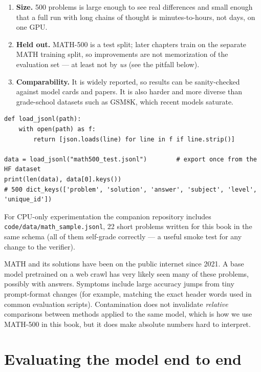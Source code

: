 \begin{enumerate}
  \item \textbf{Size.} 500 problems is large enough to see real differences and small enough that
  a full run with long chains of thought is minutes-to-hours, not days, on one GPU.
  \item \textbf{Held out.} MATH-500 is a test split; later chapters train on the separate MATH
  training split, so improvements are not memorization of the evaluation set --- at least not by
  \emph{us} (see the pitfall below).
  \item \textbf{Comparability.} It is widely reported, so results can be sanity-checked against
  model cards and papers. It is also harder and more diverse than grade-school datasets such as
  GSM8K, which recent models saturate.
\end{enumerate}

\begin{lstlisting}[caption={Loading a benchmark stored as JSON Lines.},label={lst:eval:loadjsonl}]
def load_jsonl(path):
    with open(path) as f:
        return [json.loads(line) for line in f if line.strip()]

data = load_jsonl("math500_test.jsonl")        # export once from the HF dataset
print(len(data), data[0].keys())
# 500 dict_keys(['problem', 'solution', 'answer', 'subject', 'level', 'unique_id'])
\end{lstlisting}

For CPU-only experimentation the companion repository includes \texttt{code/data/math\_sample.jsonl},
22 short problems written for this book in the same schema (all of them self-grade correctly ---
a useful smoke test for any change to the verifier).

\begin{pitfall}[Contamination]
MATH and its solutions have been on the public internet since 2021. A base model pretrained on a
web crawl has very likely seen many of these problems, possibly with answers. Symptoms include
large accuracy jumps from tiny prompt-format changes (for example, matching the exact header
words used in common evaluation scripts). Contamination does not invalidate \emph{relative}
comparisons between methods applied to the same model, which is how we use MATH-500 in this
book, but it does make absolute numbers hard to interpret.
\end{pitfall}

\section{Evaluating the model end to end}\label{sec:eval:run}


